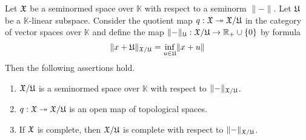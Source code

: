 \documentclass[10pt]{amsart}
\begin{document}
\begin{theorem}\label{theorem:quotients_of_seminormed_spaces}
	Let ${\mathfrak X}$ be a seminormed space over $\mathbb{K}$ with respect to a seminorm $\lVert - \rVert$. Let ${\mathfrak U}$ be a $\mathbb{K}$-linear subspace. Consider the quotient map $q:{\mathfrak X}\twoheadrightarrow {\mathfrak X}/{\mathfrak U}$ in the category of vector spaces over $\mathbb{K}$ and define the map $\lVert-\rVert_{{\mathfrak U}}:{\mathfrak X}/{\mathfrak U} \rightarrow {\mathbb R}_+\cup \{0\}$ by formula
	$$\lVert x + {\mathfrak U} \rVert_{{\mathfrak X}/{\mathfrak U}} = \inf_{u \in {\mathfrak U}}\lVert x + u \rVert$$
	Then the following assertions hold.
	\begin{enumerate}[label=\emph{\textbf{(\arabic*)}}, leftmargin=*]
		\item ${\mathfrak X}/{\mathfrak U}$ is a seminormed space over $\mathbb{K}$ with respect to $\lVert-\rVert_{{\mathfrak X}/{\mathfrak U}}$.
		\item $q:{\mathfrak X}\twoheadrightarrow {\mathfrak X}/{\mathfrak U}$ is an open map of topological spaces.
		\item If ${\mathfrak X}$ is complete, then ${\mathfrak X}/{\mathfrak U}$ is complete with respect to $\lVert - \rVert_{{\mathfrak X}/{\mathfrak U}}$.
	\end{enumerate}
\end{theorem}
\end{document}
